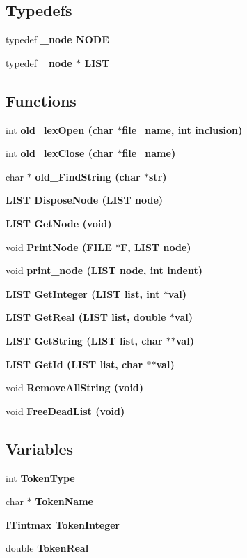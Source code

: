 \subsection*{Typedefs}
\begin{CompactItemize}
\item 
typedef \bf{\_\-node} \bf{NODE}
\item 
typedef \bf{\_\-node} $\ast$ \bf{LIST}
\end{CompactItemize}
\subsection*{Functions}
\begin{CompactItemize}
\item 
int \bf{old\_\-lex\-Open} (char $\ast$file\_\-name, int inclusion)
\item 
int \bf{old\_\-lex\-Close} (char $\ast$file\_\-name)
\item 
char $\ast$ \bf{old\_\-Find\-String} (char $\ast$str)
\item 
\bf{LIST} \bf{Dispose\-Node} (\bf{LIST} \bf{node})
\item 
\bf{LIST} \bf{Get\-Node} (void)
\item 
void \bf{Print\-Node} (FILE $\ast$\bf{F}, \bf{LIST} \bf{node})
\item 
void \bf{print\_\-node} (\bf{LIST} \bf{node}, int indent)
\item 
\bf{LIST} \bf{Get\-Integer} (\bf{LIST} \bf{list}, int $\ast$val)
\item 
\bf{LIST} \bf{Get\-Real} (\bf{LIST} \bf{list}, double $\ast$val)
\item 
\bf{LIST} \bf{Get\-String} (\bf{LIST} \bf{list}, char $\ast$$\ast$val)
\item 
\bf{LIST} \bf{Get\-Id} (\bf{LIST} \bf{list}, char $\ast$$\ast$val)
\item 
void \bf{Remove\-All\-String} (void)
\item 
void \bf{Free\-Dead\-List} (void)
\end{CompactItemize}
\subsection*{Variables}
\begin{CompactItemize}
\item 
int \bf{Token\-Type}
\item 
char $\ast$ \bf{Token\-Name}
\item 
\bf{ITintmax} \bf{Token\-Integer}
\item 
double \bf{Token\-Real}
\end{CompactItemize}


